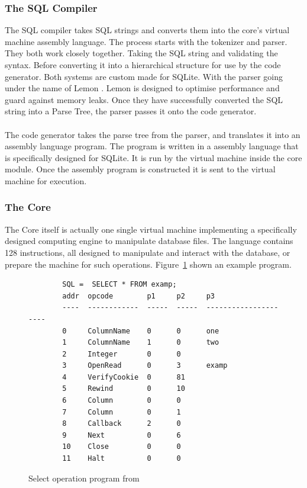 \subsubsection{The SQL Compiler}
\label{subsec:how_sqlite_compiler}

The SQL compiler takes SQL strings and converts them into the core's virtual machine assembly language. The process starts with the tokenizer and parser. They both work closely together. Taking the SQL string and validating the syntax. Before converting it into a hierarchical structure for use by the code generator. Both systems are custom made for SQLite. With the parser going under the name of Lemon \citep{sqlitedefguide}. Lemon is designed to optimise performance and guard against memory leaks. Once they have successfully converted the SQL string into a Parse Tree, the parser passes it onto the code generator.
\\\\
The code generator takes the parse tree from the parser, and translates it into an assembly language program. The program is written in a assembly language that is specifically designed for SQLite. It is run by the virtual machine inside the core module. Once the assembly program is constructed it is sent to the virtual machine for execution.

\subsubsection{The Core}
\label{subsec:how_sqlite_core}

The Core itself is actually one single virtual machine implementing a specifically designed computing engine to manipulate database files. The language contains 128 instructions, all designed to manipulate and interact with the database, or prepare the machine for such operations. Figure~\ref{fig:vm_code} shown an example program. 
\begin{figure}[H]
	\centering
	\begin{lstlisting} 
		SQL =  SELECT * FROM examp;
		addr  opcode        p1     p2     p3                                 
		----  ------------  -----  -----  ---------------------
		0     ColumnName    0      0      one                                
		1     ColumnName    1      0      two                                
		2     Integer       0      0                                         
		3     OpenRead      0      3      examp                              
		4     VerifyCookie  0      81                                        
		5     Rewind        0      10                                        
		6     Column        0      0                                         
		7     Column        0      1                                         
		8     Callback      2      0                                         
		9     Next          0      6                                         
		10    Close         0      0                                         
		11    Halt          0      0
	\end{lstlisting}
	\caption{Select operation program from \cite{sqlite}}
	\label{fig:vm_code}
\end{figure}

